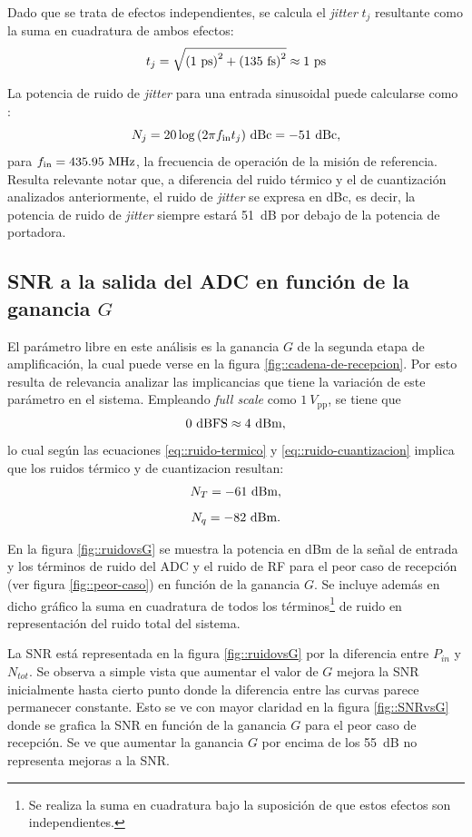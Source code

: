 \documentclass[../../main.tex]{subfiles}
\begin{document}
Dado que se trata de efectos independientes, se calcula el \textit{jitter} $t_j$ resultante como la suma en cuadratura de ambos efectos:
\[t_j = \sqrt{{(1~\textrm{ps})}^2 + {(135~\textrm{fs})}^2} \approx 1~\textrm{ps}\]

La potencia de ruido de \textit{jitter} para una entrada sinusoidal puede calcularse como \cite{formula-jitter}:
\begin{equation}
    N_j = 20 \log{\left(2 \pi  f_{\textrm{in}} t_j\right)}~\textrm{dBc} = -51~\textrm{dBc},
    \label{eq::jitter-formula}
\end{equation}
para $f_{\textrm{in}} = 435.95~\textrm{MHz}$, la frecuencia de operación de la misión de referencia. Resulta relevante notar que, a diferencia del ruido térmico y el de cuantización analizados anteriormente, el ruido de \textit{jitter} se expresa en dBc, es decir, la potencia de ruido de \textit{jitter} siempre estará 51~dB por debajo de la potencia de portadora.

\subsection{SNR a la salida del ADC en función de la ganancia $G$}
El parámetro libre en este análisis es la ganancia $G$ de la segunda etapa de amplificación, la cual puede verse en la figura \ref{fig::cadena-de-recepcion}. Por esto resulta de relevancia analizar las implicancias que tiene la variación de este parámetro en el sistema.
Empleando \textit{full scale} como $1~V_\textrm{pp}$, se tiene que 
$$0~\textrm{dBFS} \approx 4~\textrm{dBm},$$ 
lo cual según las ecuaciones \ref{eq::ruido-termico} y \ref{eq::ruido-cuantizacion} implica que los ruidos térmico y de cuantizacion resultan:
\[N_T = -61~\textrm{dBm},\] \[N_q = -82~\textrm{dBm}.\]

En la figura \ref{fig::ruidovsG} se muestra la potencia en dBm de la señal de entrada y los términos de ruido del ADC y el ruido de RF para el peor caso de recepción (ver figura \ref{fig::peor-caso}) en función de la ganancia $G$. Se incluye además en dicho gráfico la suma en cuadratura de todos los términos\footnote{Se realiza la suma en cuadratura bajo la suposición de que estos efectos son independientes.} de ruido en representación del ruido total del sistema.

La SNR está representada en la figura \ref{fig::ruidovsG} por la diferencia entre $P_{in}$ y $N_{tot}$. Se observa a simple vista que aumentar el valor de $G$ mejora la SNR inicialmente hasta cierto punto donde la diferencia entre las curvas parece permanecer constante. Esto se ve con mayor claridad en la figura \ref{fig::SNRvsG} donde se grafica la SNR en función de la ganancia $G$ para el peor caso de recepción. Se ve que aumentar la ganancia $G$ por encima de los 55~dB no representa mejoras a la SNR.
\end{document}
